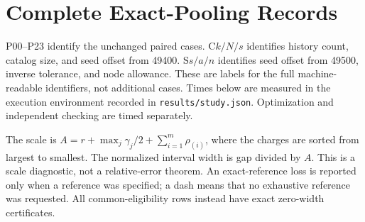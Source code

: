 \section{Complete Exact-Pooling Records}\label{sec:r49-record}
P00--P23 identify the unchanged paired cases. C$k/N/s$ identifies history count, catalog size, and seed offset from 49400. S$s/a/n$ identifies seed offset from 49500, inverse tolerance, and node allowance. These are labels for the full machine-readable identifiers, not additional cases. Times below are measured in the execution environment recorded in \texttt{results/study.json}. Optimization and independent checking are timed separately.

The scale is $A=r+\max_j\gamma_j/2+\sum_{i=1}^{m}\rho_{(i)}$, where the charges are sorted from largest to smallest. The normalized interval width is gap divided by $A$. This is a scale diagnostic, not a relative-error theorem. An exact-reference loss is reported only when a reference was specified; a dash means that no exhaustive reference was requested. All common-eligibility rows instead have exact zero-width certificates.
\setlength{\tabcolsep}{4pt}

